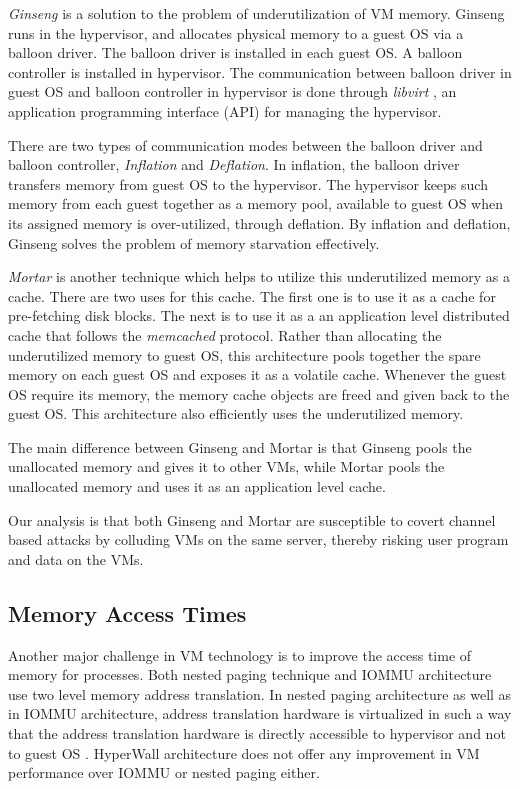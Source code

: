 \documentclass[a4paper,10pt,twocolumn]{article}
\begin{document}
  \textit{Ginseng} \cite{agmon2014ginseng} is a solution to the problem of underutilization of VM memory. Ginseng runs in the hypervisor, and allocates physical memory to a guest OS via a balloon driver. The balloon driver is installed in each guest OS. A balloon controller is installed in hypervisor. The communication between balloon driver in guest OS and balloon controller in hypervisor is done through \textit{libvirt} \cite{agmon2014ginseng}, an application programming interface (API) for managing the hypervisor.

  There are two types of communication modes between the balloon driver and balloon controller, \textit{Inflation} and  \textit{Deflation}. In inflation, the balloon driver transfers memory from guest OS to the hypervisor. The hypervisor keeps such memory from each guest together as a memory pool, available to guest OS when its assigned memory is over-utilized, through deflation. By inflation and deflation, Ginseng solves the problem of memory starvation effectively.

  \textit{Mortar} \cite{hwang2014mortar} is another technique which helps to utilize this underutilized memory as a cache. There are two uses for this cache. The first one is to use it as a cache for pre-fetching disk blocks. The next is to use it as a an application level distributed cache that follows the \textit{memcached} \cite{wang2012streaming} protocol. Rather than allocating the underutilized memory to guest OS, this architecture pools together the spare memory on each guest OS and exposes it as a volatile cache. Whenever the guest OS require its memory, the memory cache objects are freed and given back to the guest OS. This architecture also efficiently uses the underutilized memory.

  The main difference between Ginseng and Mortar is that Ginseng pools the unallocated memory and gives it to other VMs, while Mortar pools the unallocated memory and uses it as an application level cache.
  
  Our analysis is that both Ginseng and Mortar are susceptible to covert channel based attacks by colluding VMs on the same server, thereby risking user program and data on the VMs.

  \subsection{Memory Access Times}
  Another major challenge in VM technology is to improve the access time of memory for processes. Both nested paging technique and IOMMU architecture use two level memory address translation. In nested paging architecture as well as in IOMMU architecture, address translation hardware is virtualized in such a way that the address translation hardware is directly accessible to hypervisor and not to guest OS \cite{Smith2006} \cite{DarrenAbramson2006}.  HyperWall architecture does not offer any improvement in VM performance over IOMMU or nested paging either.
\end{document}
